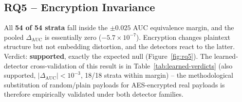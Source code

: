 \documentclass[10pt,twocolumn,a4paper]{article}
\begin{document}
\subsection{RQ5 -- Encryption Invariance}
\label{sec:rq5}

All \textbf{54 of 54 strata} fall inside the $\pm0.025$ AUC equivalence margin, and the pooled $\Delta_\text{AUC}$ is essentially zero ($-5.7\!\times\!10^{-7}$). Encryption changes plaintext structure but not embedding distortion, and the detectors react to the latter. Verdict: \textbf{supported}, exactly the expected null (Figure~\ref{fig:rq5}). The learned-detector cross-validation of this result is in Table~\ref{tab:learned-verdicts} (also supported, $|\Delta_\text{AUC}|\!<\!10^{-3}$, 18/18 strata within margin) -- the methodological substitution of random/plain payloads for AES-encrypted real payloads is therefore empirically validated under both detector families.
\end{document}
